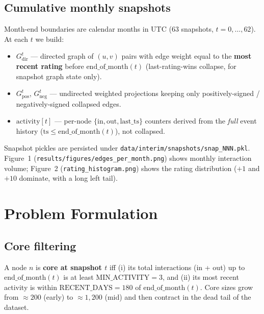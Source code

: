 \documentclass[11pt,a4paper]{article}
\newcommand{\code}[1]{\texttt{#1}}
\begin{document}
\subsection{Cumulative monthly snapshots}
Month-end boundaries are calendar months in UTC (63 snapshots,
$t = 0, \dots, 62$). At each $t$ we build:
\begin{itemize}[nosep]
  \item $G^t_{\mathrm{dir}}$ --- directed graph of $(u, v)$ pairs with edge
        weight equal to the \textbf{most recent rating} before
        $\mathrm{end\_of\_month}(t)$ (last-rating-wins collapse, for
        snapshot graph state only).
  \item $G^t_{\mathrm{pos}}$, $G^t_{\mathrm{neg}}$ --- undirected weighted
        projections keeping only positively-signed / negatively-signed
        collapsed edges.
  \item $\mathrm{activity}[t]$ --- per-node $\{\mathrm{in},\mathrm{out},
        \mathrm{last\_ts}\}$ counters derived from the \textit{full} event
        history ($\mathrm{ts} \leq \mathrm{end\_of\_month}(t)$), not
        collapsed.
\end{itemize}
Snapshot pickles are persisted under \code{data/interim/snapshots/snap\_NNN.pkl}.
Figure~1 (\code{results/figures/edges\_per\_month.png}) shows monthly
interaction volume; Figure~2 (\code{rating\_histogram.png}) shows the rating
distribution ($+1$ and $+10$ dominate, with a long left tail).

\section{Problem Formulation}

\subsection{Core filtering}
A node $n$ is \textbf{core at snapshot $t$} iff (i) its total interactions
(in + out) up to $\mathrm{end\_of\_month}(t)$ is at least
$\mathrm{MIN\_ACTIVITY} = 3$, and (ii) its most recent activity is within
$\mathrm{RECENT\_DAYS} = 180$ of $\mathrm{end\_of\_month}(t)$. Core sizes grow
from $\approx 200$ (early) to $\approx 1{,}200$ (mid) and then contract in the
dead tail of the dataset.
\end{document}
